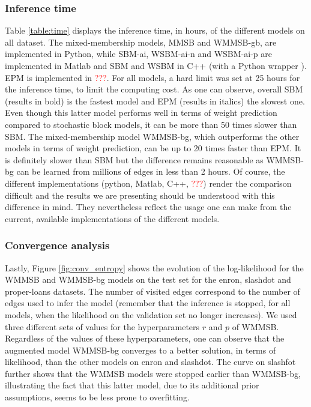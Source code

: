 \subsubsection{Inference time} 

Table \ref{table:time} displays the inference time, in hours, of the different models on all dataset. The mixed-membership models, MMSB and WMMSB-gb, are implemented in Python, while SBM-ai, WSBM-ai-n and WSBM-ai-p are implemented in Matlab and SBM and WSBM in C++ (with a Python wrapper \cite{peixoto_graph-tool_2014}). EPM is implemented in \textcolor{red}{???}. For all models, a hard limit was set at 25 hours for the inference time, to limit the computing cost. As one can observe, overall SBM (results in bold) is the fastest model and EPM (results in italics) the slowest one. Even though this latter model performs well in terms of weight prediction compared to stochastic block models, it can be more than 50 times slower than SBM. The mixed-membership model WMMSB-bg, which outperforms the other models in terms of weight prediction, can be up to 20 times faster than EPM. It is definitely slower than SBM but the difference remains reasonable as WMMSB-bg can be learned from millions of edges in less than 2 hours. Of course, the different implementations (python, Matlab, C++, \textcolor{red}{???}) render the comparison difficult and the results we are presenting should be understood with this difference in mind. They nevertheless reflect the usage one can make from the current, available implementations of the different models.

\subsubsection{Convergence analysis} 

Lastly, Figure \ref{fig:conv_entropy} shows the evolution of the log-likelihood for the WMMSB and WMMSB-bg models on the test set for the enron, slashdot and proper-loans datasets. The number of visited edges correspond to the number of edges used to infer the model (remember that the inference is stopped, for all models, when the likelihood  on the validation set no longer increases). We used three different sets of values for the hyperparameters $r$ and $p$ of WMMSB. Regardless of the values of these hyperparameters, one can observe that the augmented model WMMSB-bg converges to a better solution, in terms of likelihood, than the other models on enron and slashdot. The curve on slashfot further shows that the WMMSB models were stopped earlier than WMMSB-bg, illustrating the fact that this latter model, due to its additional prior assumptions, seems to be less prone to overfitting.
\begin{figure*}[h]
\centering
	
    \label{fig:conv_entropy}
\end{figure*}







